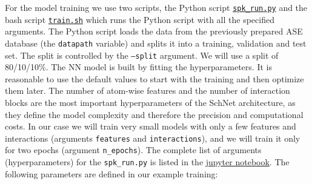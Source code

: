 For the model training we use two scripts, the Python script \href{https://github.com/LierB/gromos_tutorial_livecoms/blob/burnn_tutorial_rc/tutorial_files/t_06/train_dataset_tutorial/spk_run.py}{\texttt{spk\_run.py}} and the bash script \href{https://github.com/LierB/gromos_tutorial_livecoms/blob/burnn_tutorial_rc/tutorial_files/t_06/train_dataset_tutorial/train.sh}{\texttt{train.sh}} which runs the Python script with all the specified arguments. The Python script loads the data from the previously prepared ASE database (the \texttt{datapath} variable) and splits it into a training, validation and test set. The split is controlled by the \texttt{--split} argument. We will use a split of 80/10/10\%. The NN model is built by fitting the hyperparameters. It is reasonable to use the default values to start with the training and then optimize them later. The number of atom-wise features and the number of interaction blocks are the most important hyperparameters of the SchNet architecture, as they define the model complexity and therefore the precision and computational costs. In our case we will train very small models with only a few features and interactions (arguments \texttt{features} and \texttt{interactions}), and we will train it only for two epochs (argument \texttt{n\_epochs}). The complete list of arguments (hyperparameters) for the \texttt{spk\_run.py} is listed in the \href{https://github.com/LierB/gromos_tutorial_livecoms/blob/burnn_tutorial_rc/tutorial_files/t_06/train_dataset_tutorial/tutorial_v2.ipynb}{jupyter notebook}. The following parameters are defined in our example training:
